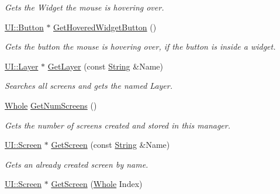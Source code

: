 \begin{DoxyCompactItemize}
\begin{DoxyCompactList}\small\item\em Gets the Widget the mouse is hovering over. \item\end{DoxyCompactList}\item 
\hyperlink{classMezzanine_1_1UI_1_1Button}{UI::Button} $\ast$ \hyperlink{classMezzanine_1_1UIManager_a8595c1650244accdff29f7e835bd3043}{GetHoveredWidgetButton} ()
\begin{DoxyCompactList}\small\item\em Gets the button the mouse is hovering over, if the button is inside a widget. \item\end{DoxyCompactList}\item 
\hyperlink{classMezzanine_1_1UI_1_1Layer}{UI::Layer} $\ast$ \hyperlink{classMezzanine_1_1UIManager_abdd684382023792153add6c5766c9e4c}{GetLayer} (const \hyperlink{namespaceMezzanine_acf9fcc130e6ebf08e3d8491aebcf1c86}{String} \&Name)
\begin{DoxyCompactList}\small\item\em Searches all screens and gets the named Layer. \item\end{DoxyCompactList}\item 
\hyperlink{namespaceMezzanine_adcbb6ce6d1eb4379d109e51171e2e493}{Whole} \hyperlink{classMezzanine_1_1UIManager_a847efdfe7496f7bf3aeaef9991a3a631}{GetNumScreens} ()
\begin{DoxyCompactList}\small\item\em Gets the number of screens created and stored in this manager. \item\end{DoxyCompactList}\item 
\hyperlink{classMezzanine_1_1UI_1_1Screen}{UI::Screen} $\ast$ \hyperlink{classMezzanine_1_1UIManager_a11a4962c5f55d915d01a5598afcff6d6}{GetScreen} (const \hyperlink{namespaceMezzanine_acf9fcc130e6ebf08e3d8491aebcf1c86}{String} \&Name)
\begin{DoxyCompactList}\small\item\em Gets an already created screen by name. \item\end{DoxyCompactList}\item 
\hyperlink{classMezzanine_1_1UI_1_1Screen}{UI::Screen} $\ast$ \hyperlink{classMezzanine_1_1UIManager_aa98be268099fc5a68f5a030a61e286d9}{GetScreen} (\hyperlink{namespaceMezzanine_adcbb6ce6d1eb4379d109e51171e2e493}{Whole} Index)

\end{DoxyCompactItemize}
